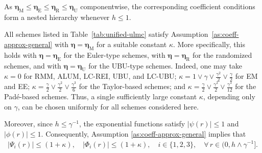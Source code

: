 \documentclass[12pt]{article}
\newenvironment{redtext}
  {\color{black}\ignorespaces}
  {\ignorespacesafterend}
\numberwithin{equation}{section}
\begin{document}
\begin{redtext}
As
\(
\boldsymbol{\eta}_{\mathrm{M}}
\leq
\boldsymbol{\eta}_{\mathrm{E}}
\leq
\boldsymbol{\eta}_{\mathrm{R}}
\leq
\boldsymbol{\eta}_{\mathrm{U}}
\)
componentwise, the corresponding coefficient conditions form a nested hierarchy whenever \(h\leq1\).


All schemes listed in Table~\ref{tab:unified-ulmc} satisfy Assumption~\ref{as:coeff-approx-general} with $\boldsymbol{\eta}=\boldsymbol{\eta}_{\mathrm M}$ for a suitable constant $\kappa$. 
More specifically, this holds with $\boldsymbol{\eta}=\boldsymbol{\eta}_{\mathrm E}$ for the Euler-type schemes, with $\boldsymbol{\eta}=\boldsymbol{\eta}_{\mathrm R}$ for the randomized schemes, and with $\boldsymbol{\eta}=\boldsymbol{\eta}_{\mathrm U}$ for the UBU-type schemes.
Indeed, one may take \(\kappa=0\) for RMM, ALUM, LC-REI, UBU, and LC-UBU; 
$\kappa
=
1\vee
\gamma\vee
\frac{\gamma^2}{2}\vee
\frac{\gamma}{2}
$
for EM and EE; 
$\kappa
=
\frac{\gamma}{2}\vee
\frac{\gamma^2}{2}\vee
\frac{\gamma^3}{6}
$ 
for the Taylor-based schemes;
and 
$\kappa
=
\frac{\gamma}{2}\vee
\frac{\gamma^2}{2}\vee
\frac{\gamma^3}{12}
$ for the Padé-based schemes. Thus, a single sufficiently large constant \(\kappa\), depending only on \(\gamma\), can be chosen uniformly for all schemes considered here.

Moreover, since $h\leq \gamma^{-1}$, the exponential functions satisfy
$|\psi(r)|\leq 1$ and $|\phi(r)|\leq 1$. Consequently, Assumption \ref{as:coeff-approx-general} implies that
\begin{align}\label{eq:bound-Psi-Phi}
    |\Psi_i(r)|\leq (1+\kappa),
    \quad |\Phi_i(r)| \leq (1+\kappa), \quad  i \in 
    \{1,2,3\},
    \quad \forall \, r\in(0,h\wedge\gamma^{-1}].
\end{align}



\end{redtext}





%


%
\end{document}
